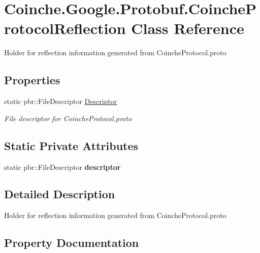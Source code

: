 \hypertarget{class_coinche_1_1_google_1_1_protobuf_1_1_coinche_protocol_reflection}{}\section{Coinche.\+Google.\+Protobuf.\+Coinche\+Protocol\+Reflection Class Reference}
\label{class_coinche_1_1_google_1_1_protobuf_1_1_coinche_protocol_reflection}


Holder for reflection information generated from Coinche\+Protocol.\+proto 


\subsection*{Properties}
\begin{DoxyCompactItemize}
\item 
static pbr\+::\+File\+Descriptor \hyperlink{class_coinche_1_1_google_1_1_protobuf_1_1_coinche_protocol_reflection_a6ec0abfdc3d27a45c490e69e185dbfdd}{Descriptor}
\begin{DoxyCompactList}\small\item\em File descriptor for Coinche\+Protocol.\+proto\end{DoxyCompactList}\end{DoxyCompactItemize}
\subsection*{Static Private Attributes}
\begin{DoxyCompactItemize}
\item 
\mbox{\label{class_coinche_1_1_google_1_1_protobuf_1_1_coinche_protocol_reflection_aa196d460ba1df0e1be672777ad6fb1e7}} 
static pbr\+::\+File\+Descriptor {\bfseries descriptor}
\end{DoxyCompactItemize}


\subsection{Detailed Description}
Holder for reflection information generated from Coinche\+Protocol.\+proto



\subsection{Property Documentation}
\mbox{\label{class_coinche_1_1_google_1_1_protobuf_1_1_coinche_protocol_reflection_a6ec0abfdc3d27a45c490e69e185dbfdd}} 
